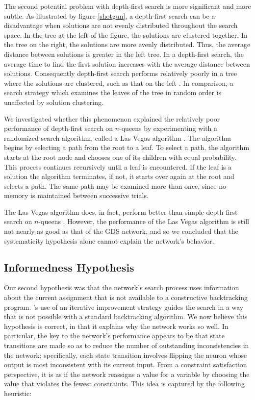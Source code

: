 \documentclass[twoside,12pt,titlepage,a4paper]{article}
\begin{document}
The second potential problem with depth-first search is more significant
and more subtle. As illustrated by figure \ref{shotgun}, a depth-first
search can be a
disadvantage when solutions are not evenly distributed throughout the
search space.  In the tree at the left of the figure, the solutions 
are clustered together. In the tree on the right,
the solutions are more evenly distributed. Thus, the average distance
between solutions is greater in the left tree.  In a depth-first
search, the average time to find the first solution 
increases with the average distance between solutions. Consequently
depth-first search performs relatively poorly in a tree where
the solutions are clustered, such as that on the left \cite{ginsberg,langley}.
In comparison,
a search strategy which examines the leaves of the tree in random
order is unaffected by solution clustering.

We investigated whether this phenomenon explained the relatively poor
performance 
of depth-first search on $n$-queens by experimenting with a randomized
search algorithm, called a Las Vegas algorithm \cite{brassard}.  The
algorithm begins by selecting a path from the root to a leaf. To
select a path, the algorithm starts at the root node and chooses one
of its children with equal probability. This process continues
recursively until a leaf is encountered.  If the leaf is a solution
the algorithm terminates, if not, it starts over again at the root and
selects a path. The same path may be examined more than once, since
no memory is maintained between successive trials.

The Las Vegas algorithm does, in fact, perform better than simple
depth-first search on $n$-queens \cite{brassard}.
However, the performance of the Las
Vegas algorithm is still not nearly as good as that of the GDS
network, and so we concluded that the systematicity hypothesis alone
cannot explain the network's behavior.

\subsection{Informedness Hypothesis}

Our second hypothesis was that the network's search process uses
information about the current assignment
that is not available to a constructive backtracking program.
's use of an iterative
improvement strategy guides the search in a way that is not possible
with a standard backtracking algorithm. 
We now believe this hypothesis
is correct, in that it explains why the network works so well.  In
particular, the key to the network's performance appears to be that
state transitions are made so as to reduce the number of outstanding
inconsistencies in the network; specifically, each state transition involves
flipping the neuron whose output is most
inconsistent with its current input. From a constraint satisfaction
perspective, it is as if the network reassigns a value for a variable
by choosing the value that violates the fewest constraints.
This idea is captured by the following heuristic:
\end{document}
